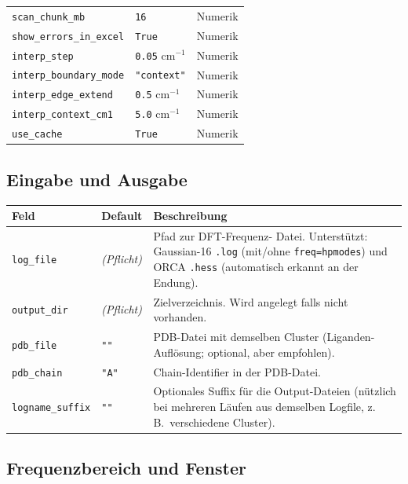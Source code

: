 \documentclass[11pt,a4paper,twoside]{article}
\theoremstyle{remark}
\begin{document}
\begin{longtable}{p{} p{} p{}}
\texttt{scan\_chunk\_mb}            & \texttt{16}          & Numerik \\
\texttt{show\_errors\_in\_excel}    & \texttt{True}        & Numerik \\
\texttt{interp\_step}               & \texttt{0.05} cm$^{-1}$ & Numerik \\
\texttt{interp\_boundary\_mode}     & \texttt{"context"}   & Numerik \\
\texttt{interp\_edge\_extend}       & \texttt{0.5} cm$^{-1}$ & Numerik \\
\texttt{interp\_context\_cm1}       & \texttt{5.0} cm$^{-1}$ & Numerik \\
\texttt{use\_cache}                 & \texttt{True}        & Numerik \\
\bottomrule
\end{longtable}



\subsection{Eingabe und Ausgabe}

\begin{longtable}{p{} p{} p{}}
\toprule
\textbf{Feld} & \textbf{Default} & \textbf{Beschreibung} \\
\midrule
\endhead
\texttt{log\_file}      & \emph{(Pflicht)} & Pfad zur DFT-Frequenz-
  Datei. Unterst\"utzt: Gaussian-16 \texttt{.log} (mit/ohne
  \texttt{freq=hpmodes}) und ORCA \texttt{.hess} (automatisch
  erkannt an der Endung). \\
\texttt{output\_dir}    & \emph{(Pflicht)} & Zielverzeichnis. Wird
  angelegt falls nicht vorhanden. \\
\texttt{pdb\_file}      & \texttt{""}     & PDB-Datei mit demselben
  Cluster (Liganden-Aufl\"osung; optional, aber empfohlen). \\
\texttt{pdb\_chain}     & \texttt{"A"}     & Chain-Identifier in der
  PDB-Datei. \\
\texttt{logname\_suffix} & \texttt{""}     & Optionales Suffix f\"ur die
  Output-Dateien (n\"utzlich bei mehreren L\"aufen aus demselben Logfile,
  z.\,B.\ verschiedene Cluster). \\
\bottomrule
\end{longtable}

\subsection{Frequenzbereich und Fenster}
\end{document}

